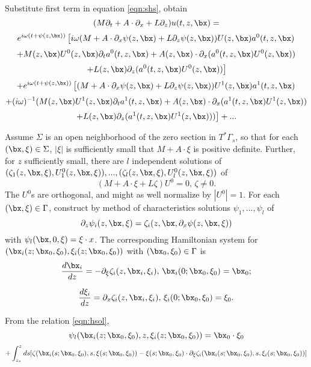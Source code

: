 Substitute first term in equation \ref{eqn:shs}, obtain
\[
(M\partial_t + A\cdot \partial_x + L \partial_z)u(t,z,\bx) =
\]
\[
 e^{i\omega(t + \psi(z,\bx))}\left[ i\omega (M + A
\cdot \partial_x \psi(z,\bx) + L \partial_z
\psi(z,\bx))U(z,\bx)a^0(t,z,\bx) \right.
\]
\[
+ M(z,\bx) U^0(z,\bx) \partial_t a^0(t,z,\bx) + A(z,\bx)\cdot \partial_x
(a^0(t,z,\bx) U^0(z,\bx))
\]
\[
 \left.   + L(z,\bx)\partial_z (a^0(t,z,\bx)U^0(z,\bx))\right]
\]
\[
+  e^{i\omega(t + \psi(z,\bx))}\left[ (M + A
\cdot \partial_x \psi(z,\bx) + L \partial_z
\psi(z,\bx))U^1(z,\bx)a^1(t,z,\bx) \right.
\]
\[
  + (i\omega)^{-1} (M(z,\bx) U^1(z,\bx) \partial_t a^1(t,z,\bx)
    + A(z,\bx)\cdot \partial_x  (a^1(t,z,\bx) U^1(z,\bx))
\]
\begin{equation}
  \label{eqn:series}
  \left.   + L(z,\bx)\partial_z (a^1(t,z,\bx)U^1(z,\bx)))\right]
+...
\end{equation}

Assume $\Sigma$ is an open neighborhood of the zero section in
$T^*\Gamma_s$, so that for each $(\bx,\xi) \in \Sigma$, $|\xi|$ is
sufficiently small that $M + A\cdot \xi$ is positive
definite. Further, for $z$ sufficiently small,
there are $l$ independent solutions of 
$(\zeta_1(z,\bx,\xi),U^0_1(z,\bx,\xi)),...,(\zeta_l(z,\bx,\xi), U^0_l(z,\bx,\xi))$ of
\begin{equation}
  \label{eqn:nullsp}
 (M + A\cdot \xi + L \zeta) U^0=0, \, \zeta\ne 0.
\end{equation}
The $U^0$s are orthogonal, and might as well normalize by
$|U^0|=1$. For each $(\bx,\xi) \in \Gamma$, construct by method of characteristics solutions
$\psi_1,...,\psi_l$ of 
\begin{equation}
  \label{eqn:eik}
\partial_z \psi_i(z,\bx,\xi) = \zeta_i(z,\bx,\partial_x\psi(z,\bx,\xi))
\end{equation}
with $\psi_l(\bx,0,\xi) =\xi \cdot x$. The corresponding Hamiltonian
system for $(\bx_i(z;\bx_0,\xi_0),\xi_i(z;\bx_0,\xi_0))$ with
$(\bx_0,\xi_0) \in \Gamma$ is
\begin{equation}
  \label{eqn:zetahe1}
  \frac{d\bx_i}{dz} = - \partial_{\xi}\zeta_i(z,\bx_i,\xi_i),\,
  \bx_i(0;\bx_0,\xi_0) = \bx_0;
\end{equation}

\begin{equation}
  \label{eqn:zetahe2}
  \frac{d\xi_i}{dz}
 = \partial_x\zeta_i(z,\bx_i,\xi_i),\, \xi_i(0;\bx_0,\xi_0) = \xi_0.
\end{equation}

From the relation \ref{eqn:hsol}, 
\[
  \psi_l(\bx_i(z;\bx_0,\xi_0),z,\xi_i(z;\bx_0,\xi_0))= \bx_0\cdot\xi_0 
\]
\begin{equation}
  \label{eqn:psihe}
+ \int_{z_s}^z ds [\zeta(\bx_i(s;\bx_0,\xi_0),s, \xi(s;\bx_0,\xi_0)) - \xi(s;\bx_0,\xi_0)\cdot \partial_{\xi}\zeta_i(\bx_i(s;\bx_0,\xi_0),s,\xi_i(s;\bx_0,\xi_0))]
\end{equation}

